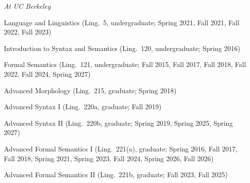 \documentclass[12pt]{article}
\begin{document}
\noindent\emph{At UC Berkeley\vspace{0.05in}}

\ind Language and Linguistics (Ling.~5, undergraduate; Spring 2021, Fall 2021, Fall 2022, Fall 2023)

\ind Introduction to Syntax and Semantics (Ling.~120, undergraduate; Spring 2016)

\ind Formal Semantics (Ling.~121, undergraduate; Fall 2015, Fall 2017, Fall 2018, Fall 2022, Fall 2024, Spring 2027)

\ind Advanced Morphology (Ling.~215, graduate; Spring 2018)

\ind Advanced Syntax I (Ling.~220a, graduate; Fall 2019)

\ind Advanced Syntax II (Ling.~220b, graduate; Spring 2019, Spring 2025, Spring 2027)

\ind Advanced Formal Semantics I (Ling.~221(a), graduate; Spring 2016, Fall 2017, Fall 2018, Spring 2021, Spring 2023, Fall 2024, Spring 2026, Fall 2026)

\ind Advanced Formal Semantics II (Ling.~221b, graduate; Fall 2023, Fall 2025)
\end{document}
